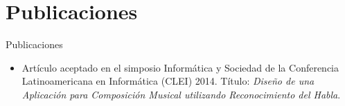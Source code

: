 \section*{Publicaciones}

\begin{frame}{Publicaciones}

\begin{itemize}
    \item Art\'iculo aceptado en el simposio Inform\'atica y Sociedad de la 
        Conferencia Latinoamericana en Inform\'atica (CLEI) 2014.
        \newline \newline T\'itulo: \emph{Diseño de una Aplicación para Composición Musical utilizando Reconocimiento del Habla}.
\end{itemize}

\end{frame}
